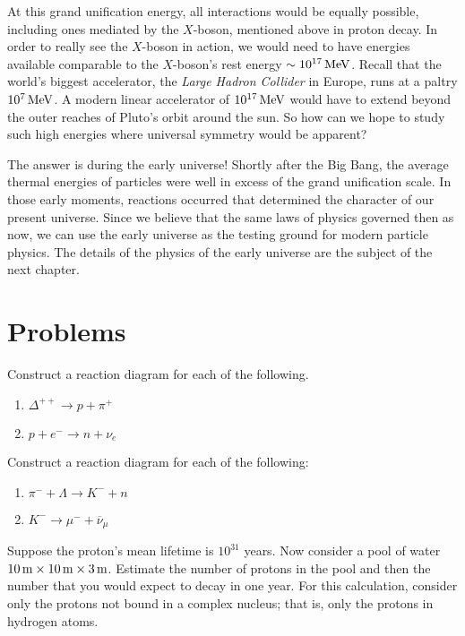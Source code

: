 At this grand unification energy, all interactions would be equally
possible, including ones mediated by the $X$-boson, mentioned above in
proton decay.  In order to really see the $X$-boson in action, we
would need to have energies available comparable to the $X$-boson's
rest energy $\sim 10^{17}\,\mbox{MeV}$.  Recall that the world's biggest
accelerator, the {\it Large Hadron Collider} in Europe, runs at a 
paltry $10^7\,\mbox{MeV}$.  A modern linear
accelerator of $10^{17}\,\mbox{MeV}$ would have to extend beyond the outer
reaches of Pluto's orbit around the sun.  So how can we hope to study
such high energies where universal symmetry would be apparent?

The answer is during the early universe!  Shortly after the Big Bang,
the average thermal energies of particles were well in excess of the
grand unification scale.  In those early moments, reactions occurred
that determined the character of our present universe.  Since we
believe that the same laws of physics governed then as now, we can use
the early universe as the testing ground for modern particle physics.
The details of the physics of the early universe are the subject of
the next chapter.


\newpage

\section*{Problems}
\label{sec:interactions_problems}

\begin{problem}
Construct a reaction diagram for each of the following.
  \begin{enumerate}
  \item $\Delta^{++} \to p + \pi^+$
  \item $p + e^- \to n + \nu_e$
  \end{enumerate}
\label{prob:reaction_diagram_i}
\end{problem}

\begin{problem}
Construct a reaction diagram for each of the following:
  \begin{enumerate}
  \item $\pi^- + \Lambda \to K^- + n$
  \item $K^- \to \mu^- + \overline\nu_\mu$
  \end{enumerate}
\label{prob:reaction_diagram_ii}
\end{problem}

\begin{problem}
Suppose the proton's mean lifetime is
$10^{31}$ years.  Now consider a pool of water $10\,\mbox{m} \times
10\,\mbox{m} \times 3\,\mbox{m}$.  Estimate the number of protons in
the pool and then the number that you would expect to decay in one
year.  For this calculation, consider only the protons not bound in a
complex nucleus; that is, only the protons in hydrogen atoms. 
\label{prob:proton_decay} 
\end{problem}

